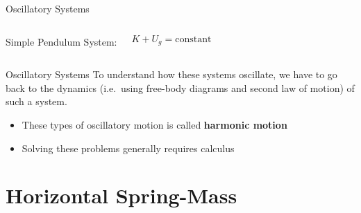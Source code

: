 \documentclass[12pt,compress,aspectratio=169]{beamer}
\begin{document}
\begin{frame}{Oscillatory Systems}
\begin{columns}[T]
    \centering

    {\footnotesize Simple Pendulum System:}\\
    \begin{displaymath}
      K+U_g=\text{constant}
    \end{displaymath}
  \end{columns}  
\end{frame}


\begin{frame}{Oscillatory Systems}
  To understand how these systems oscillate, we have to go back to the
  dynamics (i.e.\ using free-body diagrams and second law of motion) of such
  a system.
  \begin{itemize}
  \item These types of oscillatory motion is called \textbf{harmonic motion}
  \item Solving these problems generally requires calculus
  \end{itemize}
\end{frame}


\section{Horizontal Spring-Mass}

%
%  
%
\end{document}
